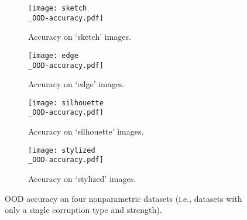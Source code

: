 \begin{figure}[h]
	\begin{subfigure}{0.49\linewidth}
		\centering
		\texttt{[image: sketch\\\_OOD-accuracy.pdf]}
		\caption{Accuracy on `sketch' images.}
		\label{subfig:benchmark_a}
		\vspace{\captionspaceII}
	\end{subfigure}\hfill
	\begin{subfigure}{0.49\linewidth}
		\centering
		\texttt{[image: edge\\\_OOD-accuracy.pdf]}
		\caption{Accuracy on `edge' images.}
		\label{subfig:benchmark_b}
		\vspace{\captionspaceII}
	\end{subfigure}\hfill
	\begin{subfigure}{0.49\linewidth}
		\centering
		\texttt{[image: silhouette\\\_OOD-accuracy.pdf]}
		\caption{Accuracy on `silhouette' images.}
		\label{subfig:benchmark_c}
		\vspace{\captionspaceII}
	\end{subfigure}\hfill
	\begin{subfigure}{0.49\linewidth}
		\centering
		\texttt{[image: stylized\\\_OOD-accuracy.pdf]}
		\caption{Accuracy on `stylized' images.}			
		\label{subfig:benchmark_d}
		\vspace{\captionspaceII}
	\end{subfigure}\hfill
	\caption{OOD accuracy on four nonparametric datasets (i.e., datasets with only a single corruption type and strength).}
	\label{fig:results_accuracy_nonparametric}
\end{figure}
